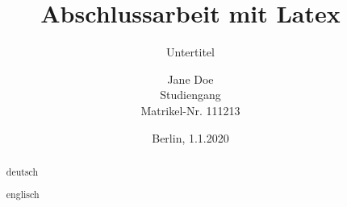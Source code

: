 \titlehead{Technische Universität Berlin\\Fakultät III -- Prozesswissenschaften\\Institut für Energietechnik}
\subject{Masterarbeit}
\title{Abschlussarbeit mit Latex}
\subtitle{Untertitel}
\author{Jane Doe\\Studiengang\\Matrikel-Nr. 111213}
\date{Berlin, 1.1.2020}

\publishers{Betreut von Prof.~Dr.-Ing.~G.~Tsatsaronis und Dr.-Ing.~M.~Hofmann\\sowie John Doe (Import Export GmbH)}


\maketitle	

\begin{abstract}
deutsch
\end{abstract}

\renewcommand\abstractname{Abstract} 
\begin{abstract}
englisch
\end{abstract}